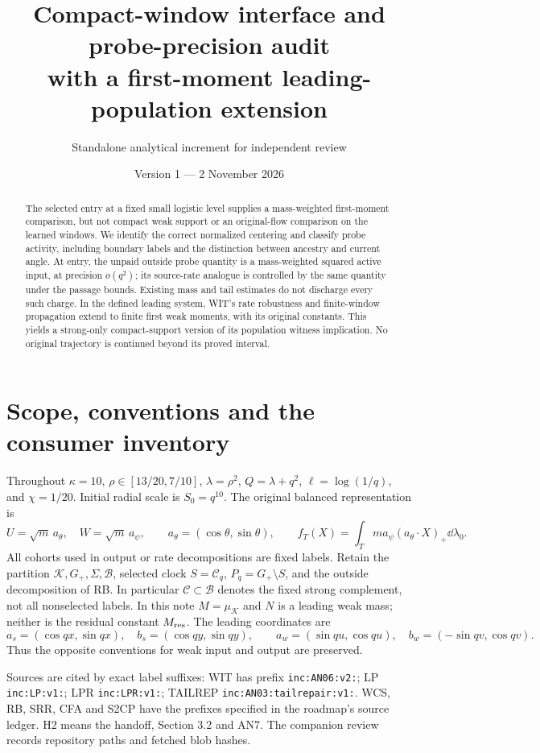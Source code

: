 \documentclass[11pt]{article}
\title{Compact-window interface and probe-precision audit\\
with a first-moment leading-population extension}
\author{Standalone analytical increment for independent review}
\date{Version 1 --- 2 November 2026}
\numberwithin{equation}{section}
\theoremstyle{remark}\newtheorem{remark}[theorem]{Remark}
\newcommand{\KK}{\mathcal K}\newcommand{\BB}{\mathcal B}
\newcommand{\Gp}{{G_+}}\newcommand{\CC}{\mathcal C}
\begin{document}
\maketitle
\begin{abstract}
The selected entry at a fixed small logistic level supplies a
mass-weighted first-moment comparison, but not compact weak support
or an original-flow comparison on the learned windows. We identify the
correct normalized centering and classify probe activity, including
boundary labels and the distinction between ancestry and current angle.
At entry, the unpaid outside probe quantity is a mass-weighted squared
active input, at precision \(o(q^2)\); its source-rate analogue is
controlled by the same quantity under the passage bounds. Existing
mass and tail estimates do not discharge every such charge.
In the defined leading system, WIT's rate robustness and finite-window
propagation extend to finite first weak moments, with its original
constants. This yields a strong-only compact-support version of its
population witness implication. No original trajectory is continued
beyond its proved interval.
\end{abstract}

\section{Scope, conventions and the consumer inventory}
\label{an07cwiv1:scope}
Throughout \(\kappa=10\), \(\rho\in[13/20,7/10]\),
\(\lambda=\rho^2\), \(Q=\lambda+q^2\), \(\ell=\log(1/q)\),
and \(\chi=1/20\). Initial radial scale is \(S_0=q^{10}\).
The original balanced representation is
\[
 U=\sqrt m\,a_\theta,\quad W=\sqrt m\,a_\psi,\qquad
 a_\theta=(\cos\theta,\sin\theta),\qquad
 f_T(X)=\int_Tm a_\psi(a_\theta\cdot X)_+\dd\lambda_0 .
\]
All cohorts used in output or rate decompositions are fixed labels.
Retain the partition \(\KK,\Gp,\Sigma,\BB\), selected clock
\(S=\mathcal C_q\), \(P_q=\Gp\setminus S\), and the outside
decomposition of RB. In particular \(\CC\subset\BB\) denotes the
fixed strong complement, not all nonselected labels.
In this note \(M=\mu_\KK\) and \(N\) is a leading weak mass;
neither is the residual constant \(M_{\rm res}\).
The leading coordinates are
\[
 a_s=(\cos qx,\sin qx),\quad b_s=(\cos qy,\sin qy),\qquad
 a_w=(\sin qu,\cos qu),\quad b_w=(-\sin qv,\cos qv).
\]
Thus the opposite conventions for weak input and output are preserved.

Sources are cited by exact label suffixes: WIT has prefix
\texttt{inc:AN06:v2:}; LP \texttt{inc:LP:v1:}; LPR
\texttt{inc:LPR:v1:}; TAILREP \texttt{inc:AN03:tailrepair:v1:}.
WCS, RB, SRR, CFA and S2CP have the prefixes specified in the
roadmap's source ledger. H2 means the handoff, Section 3.2 and AN7.
The companion review records repository paths and fetched blob hashes.
\end{document}
